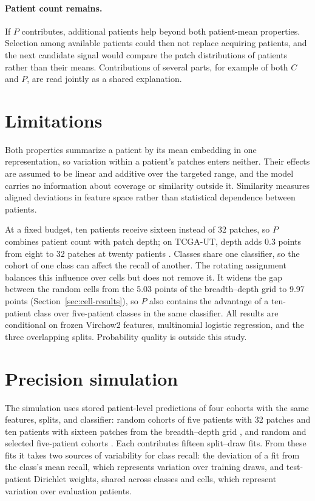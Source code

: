 \documentclass[11pt]{article}
\begin{document}
\paragraph{Patient count remains.}
If $P$ contributes, additional patients help beyond both patient-mean properties. Selection among available patients could then not replace acquiring patients, and the next candidate signal would compare the patch distributions of patients rather than their means. Contributions of several parts, for example of both $C$ and $P$, are read jointly as a shared explanation.



\section{Limitations}
\label{sec:limitations}
Both properties summarize a patient by its mean embedding in one representation, so variation within a patient's patches enters neither. Their effects are assumed to be linear and additive over the targeted range, and the model carries no information about coverage or similarity outside it. Similarity measures aligned deviations in feature space rather than statistical dependence between patients.

At a fixed budget, ten patients receive sixteen instead of 32 patches, so $P$ combines patient count with patch depth; on TCGA-UT, depth adds 0.3 points from eight to 32 patches at twenty patients \citep{queisler2026effectiveSupport}. Classes share one classifier, so the cohort of one class can affect the recall of another. The rotating assignment balances this influence over cells but does not remove it. It widens the gap between the random cells from the 5.03 points of the breadth--depth grid to 9.97 points (Section~\ref{sec:cell-results}), so $P$ also contains the advantage of a ten-patient class over five-patient classes in the same classifier. All results are conditional on frozen Virchow2 features, multinomial logistic regression, and the three overlapping splits. Probability quality is outside this study.

\appendix
\section{Precision simulation}
\label{app:precision}
The simulation uses stored patient-level predictions of four cohorts with the same features, splits, and classifier: random cohorts of five patients with 32 patches and ten patients with sixteen patches from the breadth--depth grid \citep{queisler2026effectiveSupport}, and random and selected five-patient cohorts \citep{queisler2026shortageSelection}. Each contributes fifteen split--draw fits. From these fits it takes two sources of variability for class recall: the deviation of a fit from the class's mean recall, which represents variation over training draws, and test-patient Dirichlet weights, shared across classes and cells, which represent variation over evaluation patients.
\end{document}
